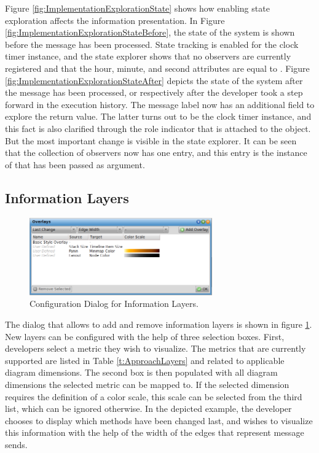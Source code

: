 Figure \ref{fig:ImplementationExplorationState} shows how enabling state exploration affects the information presentation.
In Figure \ref{fig:ImplementationExplorationStateBefore}, the state of the system is shown before the  message has been processed.
State tracking is enabled for the clock timer instance, and the state explorer shows that no observers are currently registered and that the hour, minute, and second attributes are equal to .
Figure \ref{fig:ImplementationExplorationStateAfter} depicts the state of the system after the  message has been processed, or respectively after the developer took a step forward in the execution history.
The message label now has an additional field to explore the return value.
The latter turns out to be the clock timer instance, and this fact is also clarified through the role indicator that is attached to the object.
But the most important change is visible in the state explorer.
It can be seen that the collection of observers now has one entry, and this entry is the instance of  that has been passed as argument.

\subsection{Information Layers}

\begin{figure}[tb]
	\centering
	\includegraphics[width=0.7\textwidth]{../images/04-ImplOverlays}
	\caption{Configuration Dialog for Information Layers.}
	\label{fig:ImplementationLayers}
\end{figure}

The dialog that allows to add and remove information layers is shown in figure \ref{fig:ImplementationLayers}.
New layers can be configured with the help of three selection boxes.
First, developers select a metric they wish to visualize. 
The metrics that are currently supported are listed in Table \ref{t:ApproachLayers}  and related to applicable diagram dimensions.
The second box is then populated with all diagram dimensions the selected metric can be mapped to.
If the selected dimension requires the definition of a color scale, this scale can be selected from the third list, which can be ignored otherwise.
In the depicted example, the developer chooses to display which methods have been changed last, and wishes to visualize this information with the help of the width of the edges that represent message sends.

